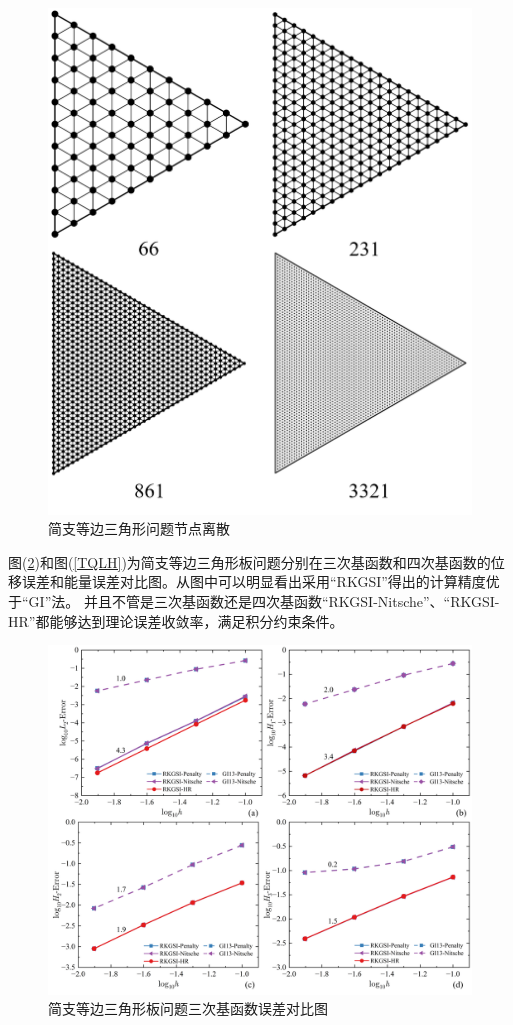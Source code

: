 \begin{figure}[!h]
    \centering
    \includegraphics[scale=0.35]{figure/P/T/triangular.msh.png}
    \caption{简支等边三角形问题节点离散}\label{triangularmsh}
\end{figure}\par
图(\ref{TCLH})和图(\ref{TQLH})为简支等边三角形板问题分别在三次基函数和四次基函数的位移误差和能量误差对比图。从图中可以明显看出采用“RKGSI”得出的计算精度优于“GI”法。
并且不管是三次基函数还是四次基函数“RKGSI-Nitsche”、“RKGSI-HR”都能够达到理论误差收敛率，满足积分约束条件。\par
\begin{figure}[!h]
    \centering
    \includegraphics[scale=0.6]{figure/P/T/CLH.png}
    \caption{简支等边三角形板问题三次基函数误差对比图}\label{TCLH}
    \end{figure}
